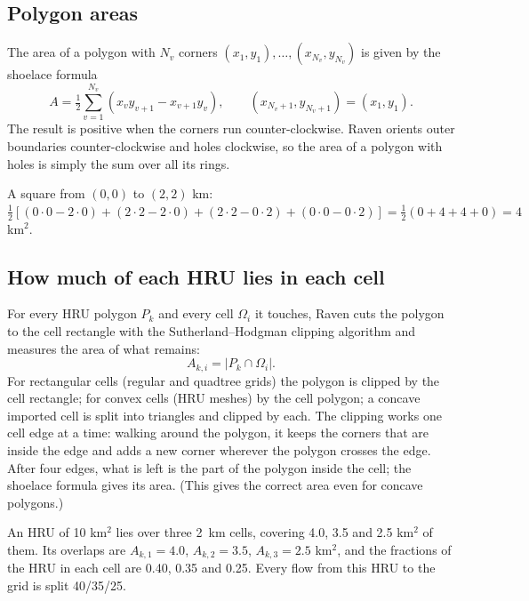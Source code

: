 \subsection{Polygon areas}
The area of a polygon with $N_v$ corners $(x_1,y_1),\dots,(x_{N_v},y_{N_v})$ is given by the shoelace formula
\begin{equation}
A=\tfrac12\sum_{v=1}^{N_v}\left(x_vy_{v+1}-x_{v+1}y_v\right),\qquad (x_{N_v+1},y_{N_v+1})=(x_1,y_1).
\end{equation}
The result is positive when the corners run counter-clockwise. Raven orients outer boundaries counter-clockwise and
holes clockwise, so the area of a polygon with holes is simply the sum over all its rings.
\begin{example}
A square from $(0,0)$ to $(2,2)$ km: $\tfrac12[(0\cdot0-2\cdot0)+(2\cdot2-2\cdot0)+(2\cdot2-0\cdot2)+(0\cdot0-0\cdot2)]=\tfrac12(0+4+4+0)=4$ km$^2$.
\end{example}

\subsection{How much of each HRU lies in each cell}\label{sec:linkage}
For every HRU polygon $P_k$ and every cell $\Omega_i$ it touches, Raven cuts the polygon to the cell rectangle with
the Sutherland--Hodgman clipping algorithm \cite{sutherland1974clip} and measures the area of what remains:
\begin{equation}
A_{k,i}=\left|P_k\cap\Omega_i\right| .
\end{equation}
For rectangular cells (regular and quadtree grids) the polygon is clipped by the cell rectangle; for convex cells (HRU
meshes) by the cell polygon; a concave imported cell is split into triangles and clipped by each. The clipping works one
cell edge at a time: walking around the polygon, it keeps the corners that are inside the edge
and adds a new corner wherever the polygon crosses the edge. After four edges, what is left is the part of the polygon
inside the cell; the shoelace formula gives its area. (This gives the correct area even for concave polygons.)

\begin{example}
An HRU of 10 km$^2$ lies over three 2~km cells, covering 4.0, 3.5 and 2.5 km$^2$ of them. Its overlaps are
$A_{k,1}=4.0$, $A_{k,2}=3.5$, $A_{k,3}=2.5$ km$^2$, and the fractions of the HRU in each cell are 0.40, 0.35 and 0.25.
Every flow from this HRU to the grid is split 40/35/25.
\end{example}

